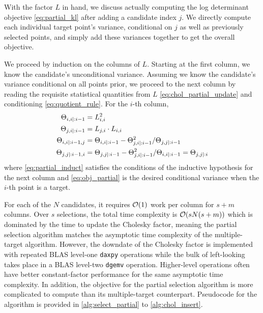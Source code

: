 \documentclass[review,supplement,onefignum,onetabnum]{siamonline220329}
\begin{document}
With the factor \( L \) in hand, we discuss
actually computing the log determinant objective
\cref{eq:partial_kl} after adding a candidate index \( j \).
We directly compute each individual target point's variance,
conditional on \( j \) as well as previously selected points, and
simply add these variances together to get the overall objective.

We proceed by induction on the columns of \( L \).
Starting at the first column, we know the candidate's unconditional variance.
Assuming we know the candidate's variance conditional on all points prior,
we proceed to the next column by reading the requisite
statistical quantities from \( L \) \cref{eq:chol_partial_update}
and conditioning \cref{eq:quotient_rule}.
For the \( i \)-th column,
\begin{align}
  \label{eq:partial_diag}
  \CM_{i, i \mid :i - 1} &= L_{i, i}^2 \\
  \CM_{j, i \mid :i - 1} &= L_{j, i} \cdot L_{i, i} \\
  \label{eq:obj_partial}
  \CM_{i, i \mid :i - 1, j} &= \CM_{i, i \mid :i - 1} -
    \CM_{j, i \mid :i - 1}^2/\CM_{j, j \mid :i - 1} \\
  \label{eq:partial_induct}
  \CM_{j, j \mid :i - 1, i} &= \CM_{j, j \mid :i - 1} -
    \CM_{j, i \mid :i - 1}^2/\CM_{i, i \mid :i - 1} = \CM_{j, j \mid :i}
\end{align}
where \cref{eq:partial_induct} satisfies the conditions of the inductive
hypothesis for the next column and \cref{eq:obj_partial} is the
desired conditional variance when the \( i \)-th point is a target.

For each of the \( N \) candidates, it requires \( \mathcal{O}(1) \) work per column
for \( s + m \) columns. Over \( s \) selections, the total time complexity is
\( \mathcal{O}(s N (s + m)) \) which is dominated by the time to update the Cholesky
factor, meaning the partial selection algorithm matches the asymptotic time
complexity of the multiple-target algorithm.
However, the downdate of the Cholesky factor is implemented with
repeated BLAS level-one \texttt{daxpy} operations while the bulk of
left-looking takes place in a BLAS level-two \texttt{dgemv} operation.
Higher-level operations often have better constant-factor
performance for the same asymptotic time complexity.
In addition, the objective for the partial selection algorithm is
more complicated to compute than its multiple-target counterpart.
Pseudocode for the algorithm is provided in
\cref{alg:select_partial} to \cref{alg:chol_insert}.
\end{document}
